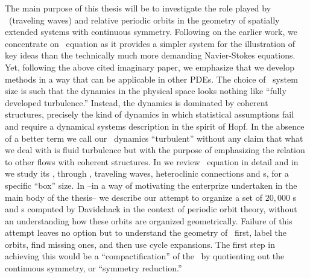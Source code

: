 The main purpose of this thesis will be to investigate the role played by \reqva\ (traveling waves)
and relative periodic orbits in the geometry of spatially extended systems with continuous symmetry. Following
on the earlier work, we concentrate on \KS\ equation as it provides a simpler system for the illustration
of key ideas than the technically much more demanding Navier-Stokes equations. Yet,
following the above cited imaginary paper, we emphasize that we develop methods in
a way that can be applicable in other PDEs.
{The choice of \KS\ system size is such that the
dynamics in the physical space looks nothing like ``fully
developed turbulence.'' Instead, the dynamics is dominated by coherent
structures, precisely the kind of dynamics in which
statistical assumptions fail and require a
dynamical systems description in the spirit of Hopf. In the
absence of a better term we call our \KS\ dynamics
``turbulent'' without any claim that what we deal with is
fluid turbulence but with the purpose of emphasizing the
relation to other flows with coherent structures.}
In  we review \KS\ equation in detail and in
 we study its \statesp, through \eqva,
traveling waves, heteroclinic connections and \rpo s, for a
specific ``box'' size.
In  --in a way of motivating the enterprize
undertaken in the main body of the thesis-- we describe our
attempt to organize a set of $20,000$ {\po s} and {\rpo s}
computed by Davidchack in the
context of periodic orbit theory, without an understanding how
these orbits are organized geometrically. Failure of this
attempt leaves no option but to understand the geometry of
\statesp\ first, label the orbits, find missing ones, and then
use cycle expansions. The first step in  achieving this would
be a ``compactification'' of the \statesp\ by quotienting out
the continuous symmetry, or ``symmetry reduction.''


